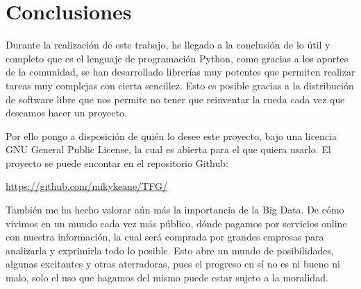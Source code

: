 
\chapter{Conclusiones}

Durante la realización de este trabajo, he llegado a la conclusión de lo útil y completo que es el lenguaje de programación Python, como gracias a los aportes de la comunidad, se han desarrollado librerías muy potentes que permiten realizar tareas muy complejas con cierta sencillez. Esto es posible gracias a la distribución de software libre que nos permite no tener que reinventar la rueda cada vez que deseamos hacer un proyecto. 

Por ello pongo a disposición de quién lo desee este proyecto, bajo una licencia GNU General Public License, la cual es abierta para el que quiera usarlo. El proyecto se puede encontar en el repositorio Github: 

\href{https://github.com/mikykeane/TFG/}{https://github.com/mikykeane/TFG/}


También me ha hecho valorar aún más la importancia de la Big Data. De cómo vivimos en un mundo cada vez más público, dónde pagamos por servicios online con nuestra información, la cual será comprada por grandes empresas para analizarla y exprimirla todo lo posible. Esto abre un mundo de posibilidades, algunas excitantes y otras aterradoras, pues el progreso en sí no es ni bueno ni malo, solo el uso que hagamos del mismo puede estar sujeto a la moralidad. 